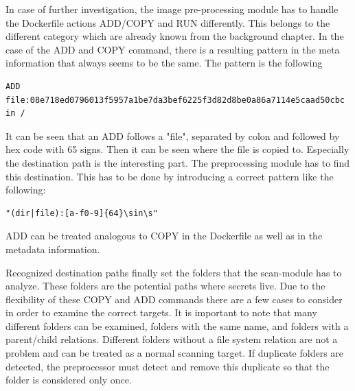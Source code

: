 In case of further investigation, the image pre-processing module has to handle the Dockerfile actions ADD/COPY and RUN differently.
This belongs to the different category which are already known from the background chapter.
In the case of the ADD and COPY command, there is a resulting pattern in the meta information that always seems to be the same.
The pattern is the following
\begin{lstlisting}
ADD file:08e718ed0796013f5957a1be7da3bef6225f3d82d8be0a86a7114e5caad50cbc in /
\end{lstlisting}
It can be seen that an ADD follows a "file", separated by colon and followed by hex code with 65 signs. Then it can be seen where the file is copied to.
Especially the destination path is the interesting part. The preprocessing module has to find this destination. This has to be done by introducing a correct pattern like the following:
\begin{lstlisting}
"(dir|file):[a-f0-9]{64}\sin\s"
\end{lstlisting}
ADD can be treated analogous to COPY in the Dockerfile as well as in the metadata information.

Recognized destination paths finally set the folders that the scan-module has to analyze. These folders are the potential paths where secrets live.
Due to the flexibility of these COPY and ADD commands there are a few cases to consider in order to examine the correct targets.
It is important to note that many different folders can be examined, folders with the same name, and folders with a parent/child relations.
Different folders without a file system relation are not a problem and can be treated as a normal scanning target. 
If duplicate folders are detected, the preprocessor must detect and remove this duplicate so that the folder is considered only once.

